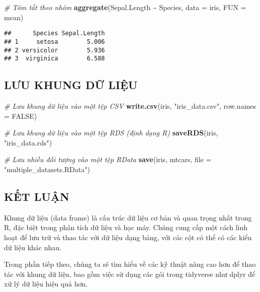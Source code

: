 \documentclass[
]{article}
\newenvironment{Shaded}{\begin{snugshade}}{\end{snugshade}}
\newcommand{\AttributeTok}[1]{\textcolor[rgb]{0.13,0.29,0.53}{#1}}
\newcommand{\CommentTok}[1]{\textcolor[rgb]{0.56,0.35,0.01}{\textit{#1}}}
\newcommand{\ConstantTok}[1]{\textcolor[rgb]{0.56,0.35,0.01}{#1}}
\newcommand{\FunctionTok}[1]{\textcolor[rgb]{0.13,0.29,0.53}{\textbf{#1}}}
\newcommand{\NormalTok}[1]{#1}
\newcommand{\SpecialCharTok}[1]{\textcolor[rgb]{0.81,0.36,0.00}{\textbf{#1}}}
\newcommand{\StringTok}[1]{\textcolor[rgb]{0.31,0.60,0.02}{#1}}
\begin{document}
\begin{Shaded}
\begin{Highlighting}[]
\CommentTok{\# Tóm tắt theo nhóm}
\FunctionTok{aggregate}\NormalTok{(Sepal.Length }\SpecialCharTok{\textasciitilde{}}\NormalTok{ Species, }\AttributeTok{data =}\NormalTok{ iris, }\AttributeTok{FUN =}\NormalTok{ mean)}
\end{Highlighting}
\end{Shaded}

\begin{verbatim}
##      Species Sepal.Length
## 1     setosa        5.006
## 2 versicolor        5.936
## 3  virginica        6.588
\end{verbatim}

\subsection{LƯU KHUNG DỮ LIỆU}\label{lux1b0u-khung-dux1eef-liux1ec7u}

\begin{Shaded}
\begin{Highlighting}[]
\CommentTok{\# Lưu khung dữ liệu vào một tệp CSV}
\FunctionTok{write.csv}\NormalTok{(iris, }\StringTok{"iris\_data.csv"}\NormalTok{, }\AttributeTok{row.names =} \ConstantTok{FALSE}\NormalTok{)}

\CommentTok{\# Lưu khung dữ liệu vào một tệp RDS (định dạng R)}
\FunctionTok{saveRDS}\NormalTok{(iris, }\StringTok{"iris\_data.rds"}\NormalTok{)}

\CommentTok{\# Lưu nhiều đối tượng vào một tệp RData}
\FunctionTok{save}\NormalTok{(iris, mtcars, }\AttributeTok{file =} \StringTok{"multiple\_datasets.RData"}\NormalTok{)}
\end{Highlighting}
\end{Shaded}

\subsection{KẾT LUẬN}\label{kux1ebft-luux1eadn}

Khung dữ liệu (data frame) là cấu trúc dữ liệu cơ bản và quan trọng nhất
trong R, đặc biệt trong phân tích dữ liệu và học máy. Chúng cung cấp một
cách linh hoạt để lưu trữ và thao tác với dữ liệu dạng bảng, với các cột
có thể có các kiểu dữ liệu khác nhau.

Trong phần tiếp theo, chúng ta sẽ tìm hiểu về các kỹ thuật nâng cao hơn
để thao tác với khung dữ liệu, bao gồm việc sử dụng các gói trong
tidyverse như dplyr để xử lý dữ liệu hiệu quả hơn.
\end{document}
